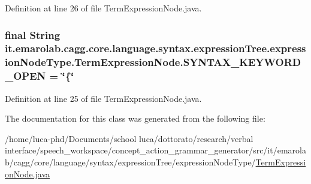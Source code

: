 Definition at line 26 of file Term\-Expression\-Node.\-java.

\hypertarget{classit_1_1emarolab_1_1cagg_1_1core_1_1language_1_1syntax_1_1expressionTree_1_1expressionNodeType_1_1TermExpressionNode_a7f29fac5dde533669194682488715dc8}{
\subsubsection[{S\-Y\-N\-T\-A\-X\-\_\-\-K\-E\-Y\-W\-O\-R\-D\-\_\-\-O\-P\-E\-N}]{\setlength{\rightskip}{0pt plus 5cm}final String it.\-emarolab.\-cagg.\-core.\-language.\-syntax.\-expression\-Tree.\-expression\-Node\-Type.\-Term\-Expression\-Node.\-S\-Y\-N\-T\-A\-X\-\_\-\-K\-E\-Y\-W\-O\-R\-D\-\_\-\-O\-P\-E\-N = \char`\"{}\{\char`\"{}\hspace{0.3cm}{\ttfamily [static]}}}\label{classit_1_1emarolab_1_1cagg_1_1core_1_1language_1_1syntax_1_1expressionTree_1_1expressionNodeType_1_1TermExpressionNode_a7f29fac5dde533669194682488715dc8}


Definition at line 25 of file Term\-Expression\-Node.\-java.



The documentation for this class was generated from the following file\-:\begin{DoxyCompactItemize}
\item 
/home/luca-\/phd/\-Documents/school luca/dottorato/research/verbal interface/speech\-\_\-workspace/concept\-\_\-action\-\_\-grammar\-\_\-generator/src/it/emarolab/cagg/core/language/syntax/expression\-Tree/expression\-Node\-Type/\hyperlink{TermExpressionNode_8java}{Term\-Expression\-Node.\-java}\end{DoxyCompactItemize}
